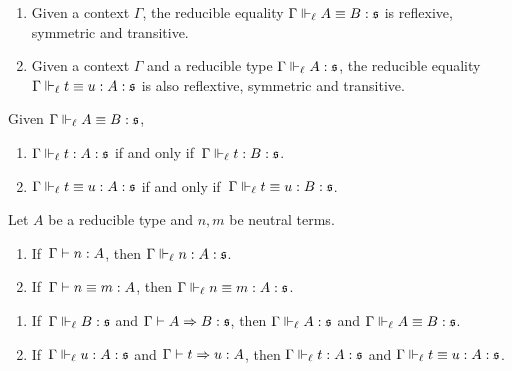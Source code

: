 \begin{lemma} \phantom{a}
  \begin{enumerate}
  \item Given a context \( \Gamma \), the reducible equality \( \Gamma \Vdash_{\ell} A \equiv B : \mathfrak{s} \) is
  reflexive, symmetric and transitive. 
  \item Given a context \( \Gamma \) and a reducible type
  \( \Gamma \Vdash_{\ell} A : \mathfrak{s} \), the reducible equality \( \Gamma \Vdash_{\ell} t \equiv u : A : \mathfrak{s} \)
  is also reflextive, symmetric and transitive.
  \end{enumerate}
\end{lemma}

\begin{lemma}[Conversion]
  Given \( \Gamma \Vdash_{\ell} A \equiv B : \mathfrak{s} \),
  \begin{enumerate}
    \item \( \Gamma \Vdash_{\ell} t : A : \mathfrak{s} \) if and only if\, \( \Gamma \Vdash_{\ell} t : B : \mathfrak{s} \).
    \item \( \Gamma \Vdash_{\ell} t \equiv u : A : \mathfrak{s} \) if and only if\, \( \Gamma \Vdash_{\ell} t \equiv u : B : \mathfrak{s} \).
  \end{enumerate}
\end{lemma}

\begin{lemma} Let \( A \) be a reducible type and \( n, m \) be neutral terms.
  \begin{enumerate}
    \item If\, \( \Gamma \vdash n : A \), then \( \Gamma \Vdash_{\ell} n : A : \mathfrak{s} \).
    \item If\, \( \Gamma \vdash n \equiv m : A \), then \( \Gamma \Vdash_{\ell} n \equiv m : A : \mathfrak{s} \).
  \end{enumerate}
\end{lemma}

\begin{lemma} \phantom{a}
  \begin{enumerate}
    \item If\, \( \Gamma \Vdash_{\ell} B : \mathfrak{s} \) and \( \Gamma \vdash A \Rightarrow B : \mathfrak{s} \),
      then \( \Gamma \Vdash_{\ell} A : \mathfrak{s} \) and \( \Gamma \Vdash_{\ell} A \equiv B : \mathfrak{s} \).
    \item If\, \( \Gamma \Vdash_{\ell} u : A : \mathfrak{s} \) and \( \Gamma \vdash t \Rightarrow u : A \),
    then \( \Gamma \Vdash_{\ell} t : A : \mathfrak{s} \) and \( \Gamma \Vdash_{\ell} t \equiv u : A : \mathfrak{s} \).
  \end{enumerate}
\end{lemma}


